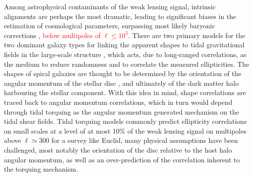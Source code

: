\documentclass[a4paper,fleqn,usenatbib]{mnras}
\newcommand\spirou[1]{\textcolor{red}{#1}}
\begin{document}
Among astrophysical contaminants of the weak lensing signal, intrinsic alignments \citep{jing_intrinsic_2002, mackey_theoretical_2002, heymans_weak_2004, altay_influence_2006, kirk_impact_2010, massey_origins_2013, kitching_limits_2016} are perhaps the most dramatic, leading to significant biases in the estimation of cosmological parameters, surpassing most likely baryonic corrections \citep{white_baryons_2004, semboloni_quantifying_2011}, \spirou{below multipoles of $\ell\leq 10^3$}. There are two primary models for the two dominant galaxy types for linking the apparent shapes to tidal gravitational fields in the large-scale structure \citep{dubinski_cosmological_1992}, which acts, due to long-ranged correlations, as the medium to reduce randomness and to correlate the measured ellipticities. The shapes of spiral galaxies are thought to be determined by the orientation of the angular momentum of the stellar disc \citep{catelan_intrinsic_2001, crittenden_spin-induced_2001, bailin_internal_2005}, and ultimately of the dark matter halo harbouring the stellar component. With this idea in mind, shape correlations are traced back to angular momentum correlations, which in turn would depend through tidal torquing as the angular momentum generated mechanism on the tidal shear fields. Tidal torquing models commonly predict ellipticity correlations on small scales at a level of at most 10\% of the weak lensing signal on multipoles above $\ell\simeq300$ for a survey like Euclid, many physical assumptions have been challenged, most notably the orientation of the disc relative to the host halo angular momentum, as well as an over-prediction of the correlation inherent to the torquing mechanism.
\end{document}
